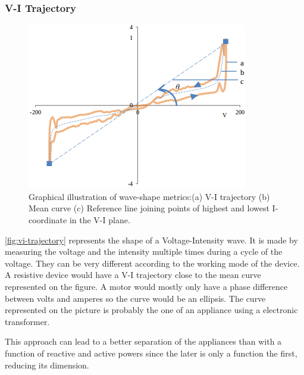 \subsubsection{V-I Trajectory}\label{section-vi}
\begin{figure}
    \centering
    \includegraphics[width=\linewidth]{img/vi-trajectory.png}
    \caption[Graphical illustration of wave-shape metrics]{Graphical illustration of wave-shape metrics:(a) V-I trajectory  (b) Mean curve    (c)  Reference line  joining points  of highest  and lowest  I-coordinate in the V-I plane. \cite{hassan2014empirical}}
    \label{fig:vi-trajectory}
    \vspace{-30pt}
\end{figure}
\autoref{fig:vi-trajectory} represents the shape of a Voltage-Intensity wave. It is made by measuring the voltage and the intensity multiple times during a cycle of the voltage. \cite{hassan2014empirical} They can be very different according to the working mode of the device. A resistive device would have a V-I trajectory close to the mean curve represented on the figure. A motor would mostly only have a phase difference between volts and amperes so the curve would be an ellipsis. The curve represented on the picture is probably the one of an appliance using a electronic transformer.

This approach can lead to a better separation of the appliances than with a function of reactive and active powers since the later is only a function the first, reducing its dimension.

